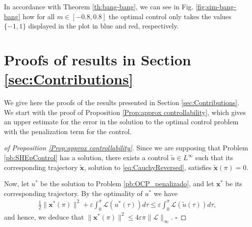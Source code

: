 \documentclass[twocolumn]{autart}    %
\begin{document}
In accordance with Theorem \ref{th:bang-bang}, we can see in Fig. \ref{fig:sim-bang-bang} how for all $m \in [-0.8,0.8]$ the optimal control only takes the values $\{-1,1\}$ displayed in the plot in blue and red, respectively. 

\section{Proofs of results in Section \ref{sec:Contributions}}\label{sec:Proof}

We give here the proofs of the results presented in Section \ref{sec:Contributions}. We start with the proof of Proposition \ref{Prop:approx controllability}, which gives an upper estimate for the error in the solution to the optimal control problem with the penalization term for the control. 

\bigskip

\begin{proof}[of Proposition \ref{Prop:approx controllability}]
Since we are supposing that Problem \ref{pb:SHEpControl} has a solution, there exists a control $\tilde{u}\in L^\infty$ such that its corresponding trajectory $\tilde{\bm{x}}$, solution to \eqref{eq:CauchyReversed}, satisfies $\tilde{\bm{x}}(\pi) = 0$. 

Now, let $u^\ast$ be the solution to Problem \ref{pb:OCP_penalizado}, and let $\bm{x}^\ast$ be its corresponding trajectory. By the optimality of $u^\ast$ we have
\begin{align*}
	\frac{1}{2} \| \bm{x}^\ast(\pi)\|^2 +\varepsilon \int_0^\pi \mathcal{L}(u^\ast(\tau))d\tau \leq \varepsilon \int_0^\pi \mathcal{L}(\tilde{u}(\tau))d\tau,
\end{align*}
and hence, we deduce that $\| \bm{x}^\ast (\pi)\|^2 \leq 4 \varepsilon \pi \| \mathcal{L}\|_\infty.$ \hfill $\square$
\end{proof}
\end{document}
